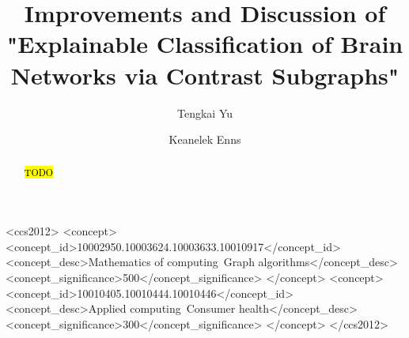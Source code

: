 \documentclass[sigconf]{acmart}
\begin{document}
\graphicspath{ {./img/} }


\title[Contrast Subgraphs of Brain Networks]{Improvements and Discussion of "Explainable Classification of Brain Networks via Contrast Subgraphs"}

\author{Tengkai Yu}

\author{Keanelek Enns}

\renewcommand{\shortauthors}{T. Yu and K. Enns}

\begin{abstract}
\hl{TODO}
\end{abstract}

\begin{CCSXML}
<ccs2012>
   <concept>
       <concept_id>10002950.10003624.10003633.10010917</concept_id>
       <concept_desc>Mathematics of computing~Graph algorithms</concept_desc>
       <concept_significance>500</concept_significance>
       </concept>
   <concept>
       <concept_id>10010405.10010444.10010446</concept_id>
       <concept_desc>Applied computing~Consumer health</concept_desc>
       <concept_significance>300</concept_significance>
       </concept>
 </ccs2012>
\end{CCSXML}


\end{document}
